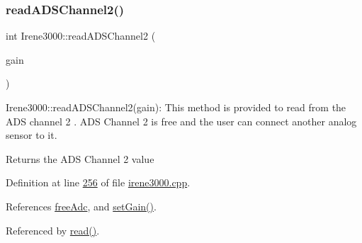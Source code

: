 \mbox{\label{class_irene3000_ae73bd2ed14a199a7e83f4d6458476a7c}} 
\subsubsection{\texorpdfstring{read\+A\+D\+S\+Channel2()}{readADSChannel2()}}
{\footnotesize\ttfamily int Irene3000\+::read\+A\+D\+S\+Channel2 (\begin{DoxyParamCaption}\item[{ads\+Gain\+\_\+t}]{gain }\end{DoxyParamCaption})}

Irene3000\+::read\+A\+D\+S\+Channel2(gain)\+: This method is provided to read from the A\+DS channel 2 . A\+DS Channel 2 is free and the user can connect another analog sensor to it.

\begin{DoxyReturn}{Returns}
the A\+DS Channel 2 value 
\end{DoxyReturn}


Definition at line \hyperlink{irene3000_8cpp_source_l00256}{256} of file \hyperlink{irene3000_8cpp_source}{irene3000.\+cpp}.



References \hyperlink{_irene3000_8h_source_l00026}{free\+Adc}, and \hyperlink{irene3000_8cpp_source_l00242}{set\+Gain()}.



Referenced by \hyperlink{irene3000_8cpp_source_l00035}{read()}.



